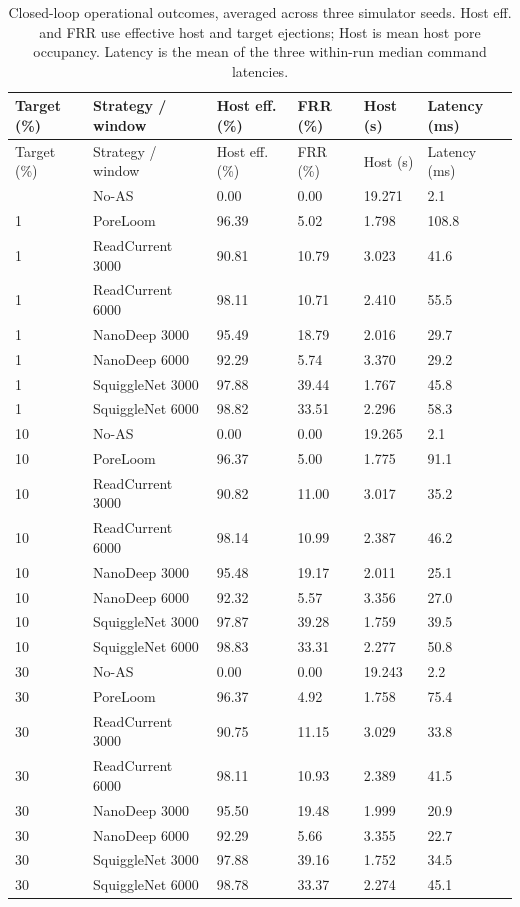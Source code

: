 \begin{longtable}{llllll}
\caption{Closed-loop operational outcomes, averaged across three simulator seeds. Host eff. and FRR use effective host and target ejections; Host is mean host pore occupancy. Latency is the mean of the three within-run median command latencies.}\label{tab:s_icarust_operations}\\
\toprule
Target (\%) & Strategy / window & Host eff. (\%) & FRR (\%) & Host (s) & Latency (ms)\\\midrule\endfirsthead
\toprule
Target (\%) & Strategy / window & Host eff. (\%) & FRR (\%) & Host (s) & Latency (ms)\\\midrule\endhead
\bottomrule\endfoot
1 & No-AS & 0.00 & 0.00 & 19.271 & 2.1\\
1 & PoreLoom & 96.39 & 5.02 & 1.798 & 108.8\\
1 & ReadCurrent 3000 & 90.81 & 10.79 & 3.023 & 41.6\\
1 & ReadCurrent 6000 & 98.11 & 10.71 & 2.410 & 55.5\\
1 & NanoDeep 3000 & 95.49 & 18.79 & 2.016 & 29.7\\
1 & NanoDeep 6000 & 92.29 & 5.74 & 3.370 & 29.2\\
1 & SquiggleNet 3000 & 97.88 & 39.44 & 1.767 & 45.8\\
1 & SquiggleNet 6000 & 98.82 & 33.51 & 2.296 & 58.3\\
10 & No-AS & 0.00 & 0.00 & 19.265 & 2.1\\
10 & PoreLoom & 96.37 & 5.00 & 1.775 & 91.1\\
10 & ReadCurrent 3000 & 90.82 & 11.00 & 3.017 & 35.2\\
10 & ReadCurrent 6000 & 98.14 & 10.99 & 2.387 & 46.2\\
10 & NanoDeep 3000 & 95.48 & 19.17 & 2.011 & 25.1\\
10 & NanoDeep 6000 & 92.32 & 5.57 & 3.356 & 27.0\\
10 & SquiggleNet 3000 & 97.87 & 39.28 & 1.759 & 39.5\\
10 & SquiggleNet 6000 & 98.83 & 33.31 & 2.277 & 50.8\\
30 & No-AS & 0.00 & 0.00 & 19.243 & 2.2\\
30 & PoreLoom & 96.37 & 4.92 & 1.758 & 75.4\\
30 & ReadCurrent 3000 & 90.75 & 11.15 & 3.029 & 33.8\\
30 & ReadCurrent 6000 & 98.11 & 10.93 & 2.389 & 41.5\\
30 & NanoDeep 3000 & 95.50 & 19.48 & 1.999 & 20.9\\
30 & NanoDeep 6000 & 92.29 & 5.66 & 3.355 & 22.7\\
30 & SquiggleNet 3000 & 97.88 & 39.16 & 1.752 & 34.5\\
30 & SquiggleNet 6000 & 98.78 & 33.37 & 2.274 & 45.1\\
\end{longtable}
